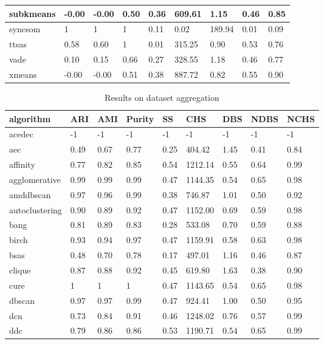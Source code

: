 \begin{table}[H]
\begin{tabular}{|l|l|l|l|l|l|l|l|l|}
\hline
subkmeans & -0.00 & -0.00 & 0.50 & 0.36 & 609.61 & 1.15 & 0.46 & 0.85 \\
\hline
syncsom & 1 & 1 & 1 & 0.11 & 0.02 & 189.94 & 0.01 & 0.09 \\
\hline
ttsas & 0.58 & 0.60 & 1 & 0.01 & 315.25 & 0.90 & 0.53 & 0.76 \\
\hline
vade & 0.10 & 0.15 & 0.66 & 0.27 & 328.55 & 1.18 & 0.46 & 0.77 \\
\hline
xmeans & -0.00 & -0.00 & 0.51 & 0.38 & 887.72 & 0.82 & 0.55 & 0.90 \\
\hline
\end{tabular}
\end{table}



\begin{table}[H]
\centering
\caption{Results on dataset aggregation}
\label{S59_Table}
\begin{tabular}{|l|l|l|l|l|l|l|l|l|}
\hline
algorithm & ARI & AMI & Purity & SS & CHS & DBS & NDBS & NCHS \\
\hline
acedec & -1 & -1 & -1 & -1 & -1 & -1 & -1 & -1 \\
\hline
aec & 0.49 & 0.67 & 0.77 & 0.25 & 404.42 & 1.45 & 0.41 & 0.84 \\
\hline
affinity & 0.77 & 0.82 & 0.85 & 0.54 & 1212.14 & 0.55 & 0.64 & 0.99 \\
\hline
agglomerative & 0.99 & 0.99 & 0.99 & 0.47 & 1144.35 & 0.54 & 0.65 & 0.98 \\
\hline
amddbscan & 0.97 & 0.96 & 0.99 & 0.38 & 746.87 & 1.01 & 0.50 & 0.92 \\
\hline
autoclustering & 0.90 & 0.89 & 0.92 & 0.47 & 1152.00 & 0.69 & 0.59 & 0.98 \\
\hline
bang & 0.81 & 0.89 & 0.83 & 0.28 & 533.08 & 0.70 & 0.59 & 0.88 \\
\hline
birch & 0.93 & 0.94 & 0.97 & 0.47 & 1159.91 & 0.58 & 0.63 & 0.98 \\
\hline
bsas & 0.48 & 0.70 & 0.78 & 0.17 & 497.01 & 1.16 & 0.46 & 0.87 \\
\hline
clique & 0.87 & 0.88 & 0.92 & 0.45 & 619.80 & 1.63 & 0.38 & 0.90 \\
\hline
cure & 1 & 1 & 1 & 0.47 & 1143.65 & 0.54 & 0.65 & 0.98 \\
\hline
dbscan & 0.97 & 0.97 & 0.99 & 0.47 & 924.41 & 1.00 & 0.50 & 0.95 \\
\hline
dcn & 0.73 & 0.84 & 0.91 & 0.46 & 1248.02 & 0.76 & 0.57 & 0.99 \\
\hline
ddc & 0.79 & 0.86 & 0.86 & 0.53 & 1190.71 & 0.54 & 0.65 & 0.99 \\

\end{tabular}
\end{table}
